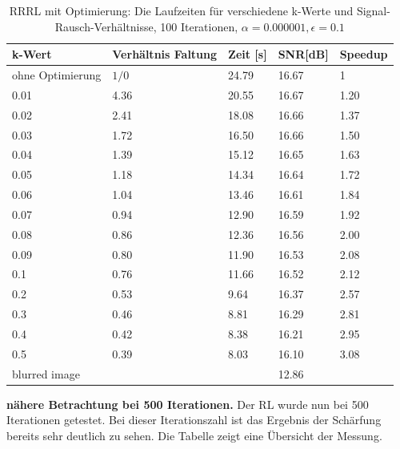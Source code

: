 \documentclass[a4paper,12pt]{article}
\begin{document}
\begin{table}[h]
\begin{center}
\begin{tabular}{ | l | l | l | l | l |}
\hline
k-Wert 			&	Verhältnis Faltung 	& Zeit [s] & SNR[dB] & Speedup \\ \hline
ohne Optimierung& 		$1/0$			& 	24.79 & 16.67    & 	1	\\ \hline
0.01			& 		4.36			&	20.55 & 16.67    &  	1.20\\
0.02			& 		2.41			&	18.08 & 16.66    & 	1.37\\
0.03			& 		1.72			&	16.50 & 16.66    & 	1.50\\
0.04			&		1.39			&	15.12 & 16.65    & 	1.63\\
0.05			& 		1.18			&	14.34 & 16.64    & 	1.72\\
0.06			& 		1.04			&	13.46 & 16.61    & 	1.84\\ 
0.07			& 		0.94			&	12.90 & 16.59    & 	1.92\\
0.08			& 		0.86			&	12.36 & 16.56    & 	2.00\\
0.09			& 		0.80			&	11.90 & 16.53    & 	2.08\\
0.1				& 		0.76			&	11.66 & 16.52    & 	2.12\\
0.2				&		0.53			&	9.64  & 16.37    & 	2.57\\
0.3				&		0.46			&	8.81  & 16.29    & 	2.81\\
0.4				& 		0.42			&   8.38  & 16.21    & 	2.95\\
0.5				& 		0.39			&	8.03  & 16.10    & 	3.08\\ \hline
blurred image	&		 				& 		  & 12.86 	 & \\
\hline
\end{tabular}
\caption{RRRL mit Optimierung: Die Laufzeiten für verschiedene k-Werte
und Signal-Rausch-Verhältnisse, 100 Iterationen, $\alpha = 0.000001, \epsilon = 0.1$}
\label{tab:konv_time_SNR_RRRL}
\end{center}
\end{table}


\textbf{nähere Betrachtung bei 500 Iterationen.}
Der RL wurde nun bei 500 Iterationen getestet. Bei dieser Iterationszahl ist das
Ergebnis der Schärfung bereits sehr deutlich zu sehen. Die Tabelle zeigt eine
Übersicht der Messung.
\end{document}
